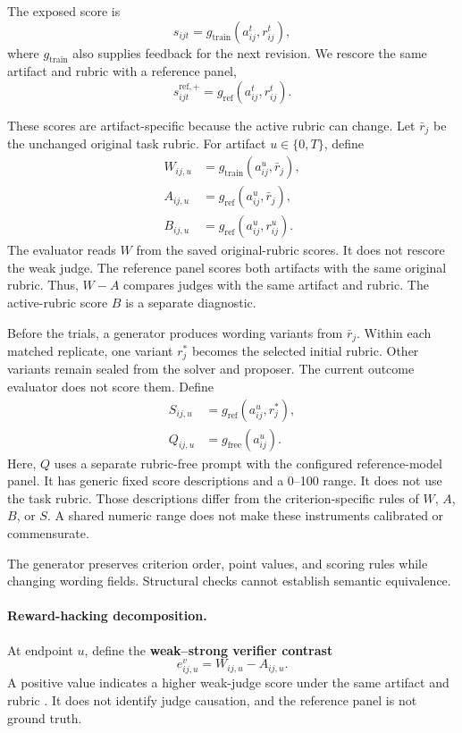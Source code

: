\documentclass{article} %
\begin{document}
The exposed score is
\begin{equation}
s_{ijt}=g_{\mathrm{train}}\!\left(a_{ij}^t,r_{ij}^t\right),
\end{equation}
where $g_{\mathrm{train}}$ also supplies feedback for the next revision. We
rescore the same artifact and rubric with a reference panel,
\begin{equation}
s^{\mathrm{ref},+}_{ijt}
=g_{\mathrm{ref}}\!\left(a_{ij}^t,r_{ij}^t\right).
\end{equation}

These scores are artifact-specific because the active rubric can change. Let
$\bar r_j$ be the unchanged original task rubric. For artifact
$u\in\{0,T\}$, define
\begin{align}
W_{ij,u}&=g_{\mathrm{train}}\!\left(a_{ij}^{u},\bar r_j\right), \\
A_{ij,u}&=g_{\mathrm{ref}}\!\left(a_{ij}^{u},\bar r_j\right), \\
B_{ij,u}&=g_{\mathrm{ref}}\!\left(a_{ij}^{u},r_{ij}^{u}\right).
\end{align}
The evaluator reads $W$ from the saved original-rubric scores. It does not
rescore the weak judge. The reference panel scores both artifacts with the same
original rubric. Thus, $W-A$ compares judges with the same artifact and rubric.
The active-rubric score $B$ is a separate diagnostic.

Before the trials, a generator produces wording variants from $\bar r_j$.
Within each matched replicate, one variant $r_j^*$ becomes the
selected initial rubric. Other variants remain sealed from the solver and
proposer. The current outcome evaluator does not score them. Define
\begin{align}
S_{ij,u}&=g_{\mathrm{ref}}\!\left(a_{ij}^{u},r_j^*\right), \\
Q_{ij,u}&=g_{\mathrm{free}}\!\left(a_{ij}^{u}\right).
\end{align}
Here, $Q$ uses a separate rubric-free prompt with the configured reference-model
panel. It has generic fixed score descriptions and a 0--100 range. It does not use the task rubric. Those descriptions differ from the
criterion-specific rules of $W$, $A$, $B$, or $S$. A shared numeric range does
not make these instruments calibrated or commensurate.

The generator preserves criterion order, point values, and scoring rules while
changing wording fields. Structural checks cannot establish semantic
equivalence.

\paragraph{Reward-hacking decomposition.}
At endpoint $u$, define the \textbf{weak--strong verifier contrast}
\begin{equation}
e^v_{ij,u}=W_{ij,u}-A_{ij,u}.
\end{equation}
A positive value indicates a higher weak-judge score under the same artifact and
rubric \citep{mahmoud2026reward}. It does not identify judge causation, and the
reference panel is not ground truth.
\end{document}
